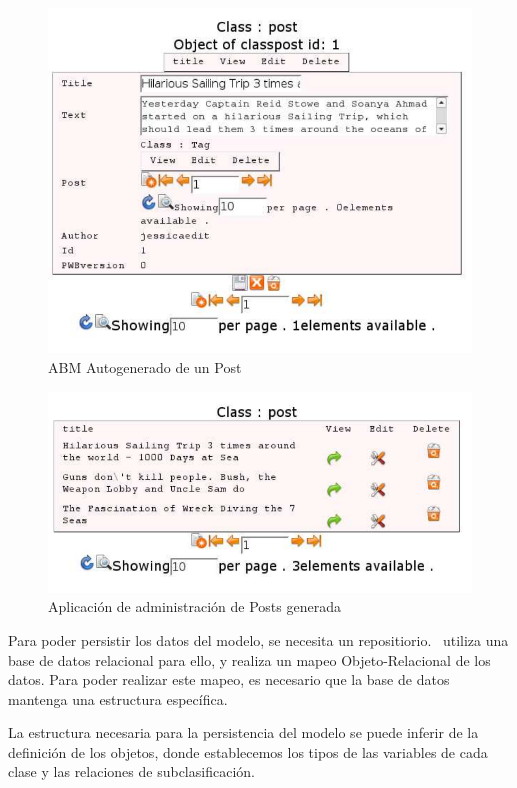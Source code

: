 \begin{figure}
	\centering
	\includegraphics[scale=0.5]{images/abm1.pdf}
 	\caption{ABM Autogenerado de un Post}
 	\label{fig-abm1}
\end{figure}

\begin{figure}
	\centering
	\includegraphics[scale=0.5]{images/abm2.pdf}
 	\caption{Aplicación de administración de Posts generada}
 	\label{fig-abm2}
\end{figure}

Para poder persistir los datos del modelo, se necesita un repositiorio. \PWB\ utiliza una base de datos relacional para ello, y realiza un mapeo Objeto-Relacional de los datos. Para poder realizar este mapeo, es necesario que la base de datos mantenga una estructura específica.

La estructura necesaria para la persistencia del modelo se puede inferir de la definición de los objetos, donde establecemos los tipos de las variables de cada clase y las relaciones de subclasificación.


